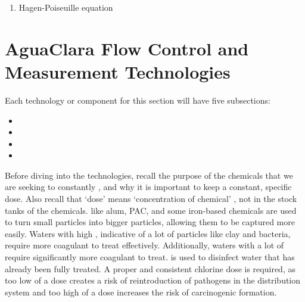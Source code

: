 \documentclass[letterpaper,10pt,english]{sphinxmanual}
\begin{document}
\begin{enumerate}
\item {} 
Hagen-Poiseuille equation

\end{enumerate}


\section{AguaClara Flow Control and Measurement Technologies}
\label{\detokenize{Flow_Control_and_Measurement/FCM_Design:aguaclara-flow-control-and-measurement-technologies}}\label{\detokenize{Flow_Control_and_Measurement/FCM_Design:heading-aguaclara-flow-control-and-measurement-technologies}}
Each technology or component for this section will have five subsections:
\begin{itemize}
\item {} 

\item {} 

\item {} 

\item {} 

\end{itemize}

Before diving into the technologies, recall the purpose of the chemicals that we are seeking to constantly , and why it is important to keep a constant, specific dose. Also recall that ‘dose’ means ‘concentration of chemical’ , not in the stock tanks of the chemicals.  like alum, PAC, and some iron-based chemicals are used to turn small particles into bigger particles, allowing them to be captured more easily. Waters with high , indicative of a lot of particles like clay and bacteria, require more coagulant to treat effectively. Additionally, waters with a lot of  require significantly more coagulant to treat.  is used to disinfect water that has already been fully treated. A proper and consistent chlorine dose is required, as too low of a dose creates a risk of reintroduction of pathogens in the distribution system and too high of a dose increases the risk of carcinogenic  formation.
\end{document}
